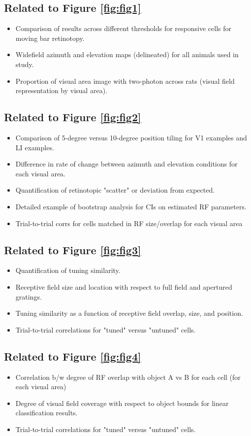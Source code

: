 \documentclass{article}
\begin{document}
\subsection{Related to Figure \ref{fig:fig1}}
\begin{itemize}
\item Comparison of results across different thresholds for responsive cells for moving bar retinotopy.
\item Widefield azimuth and elevation maps (delineated) for all animals used in study.
\item Proportion of visual area image with two-photon across rats (visual field representation by visual area).
\end{itemize}
\subsection{Related to Figure \ref{fig:fig2}}
\begin{itemize}
\item Comparison of 5-degree versus 10-degree position tiling for V1 examples and LI examples.
\item Difference in rate of change between azimuth and elevation conditions for each visual area.
\item Quantification of retinotopic "scatter" or deviation from expected.
\item Detailed example of bootstrap analysis for CIs on estimated RF parameters. 
\item Trial-to-trial corrs for cells matched in RF size/overlap for each visual area
\end{itemize}
\subsection{Related to Figure \ref{fig:fig3}}
\begin{itemize}
\item Quantification of tuning similarity.
\item Receptive field size and location with respect to full field and apertured gratings.
\item Tuning similarity as a function of receptive field overlap, size, and position.
\item Trial-to-trial correlations for "tuned" versus "untuned" cells.
\end{itemize}

\subsection{Related to Figure \ref{fig:fig4}}
\begin{itemize}
\item Correlation b/w degree of RF overlap with object A vs B for each cell (for each visual area)
\item Degree of visual field coverage with respect to object bounds for linear classification results.
\item Trial-to-trial correlations for "tuned" versus "untuned" cells.
\end{itemize}
\end{document}
